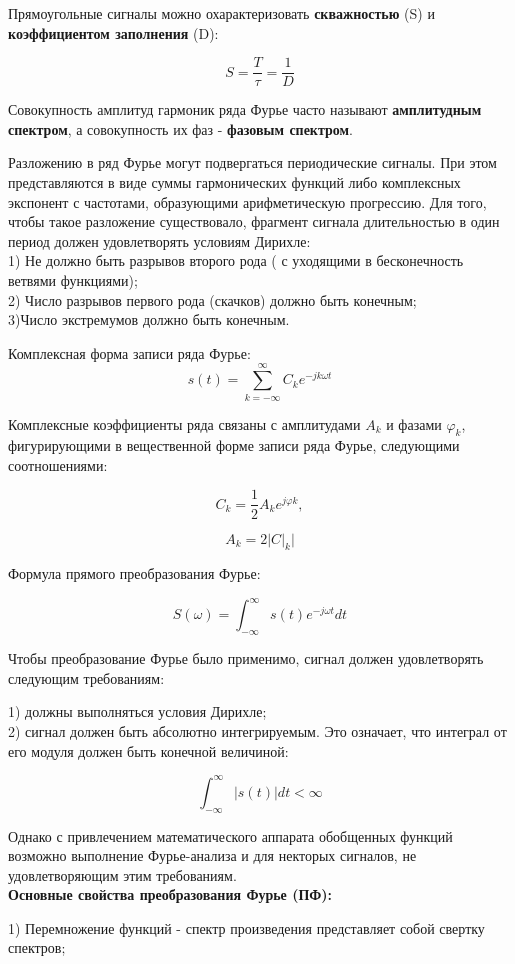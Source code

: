 \documentclass[12pt,a4paper]{scrartcl}
\begin{document}
Прямоугольные сигналы можно охарактеризовать \textbf{скважностью} (S) и \textbf{коэффициентом заполнения} (D):

$$S=\frac{T}{\tau}=\frac{1}{D}$$

Совокупность амплитуд гармоник ряда Фурье часто называют \textbf{амплитудным спектром}, а совокупность их фаз - \textbf{фазовым спектром}.

Разложению в ряд Фурье могут подвергаться периодические сигналы. При этом представляются в виде суммы гармонических функций либо комплексных экспонент с частотами, образующими арифметическую прогрессию. Для того, чтобы такое разложение существовало, фрагмент сигнала длительностью в один период должен удовлетворять условиям Дирихле:\\
1) Не должно быть разрывов второго рода ( с уходящими в бесконечность ветвями функциями);\\
2) Число разрывов первого рода (скачков) должно быть конечным;\\
3)Число экстремумов должно быть конечным.

Комплексная форма записи ряда Фурье:
$$s(t)=\sum_{k=-\infty}^\infty C_k e^{-jk\omega t}$$

Комплексные коэффициенты ряда связаны с амплитудами $A_k$ и фазами $\varphi _k$, фигурирующими в вещественной форме записи ряда Фурье, следующими соотношениями:

$$C_k = \frac{1}{2}A_k e^{j\varphi k},$$

$$A_k = 2|C|_k|$$

Формула прямого преобразования Фурье:

$$S(\omega) = \int_{-\infty}^\infty s(t) e^{-j\omega t} dt$$

Чтобы преобразование Фурье было применимо, сигнал должен удовлетворять следующим требованиям:

1) должны выполняться условия Дирихле;\\
2) сигнал должен быть абсолютно интегрируемым. Это означает, что интеграл от его модуля должен быть конечной величиной:

$$\int_{-\infty}^\infty|s(t)|dt<\infty$$

Однако с привлечением математического аппарата обобщенных функций возможно выполнение Фурье-анализа и для некторых сигналов, не удовлетворяющим этим требованиям.
\\

\textbf{Основные свойства преобразования Фурье (ПФ):}

1) Перемножение функций - спектр произведения представляет собой свертку спектров;
\end{document}
